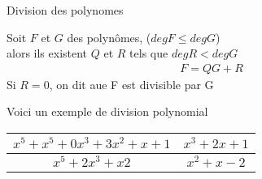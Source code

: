 \begin{definition}{Division des polynomes}
	\begin{theorem}
		Soit $F$ et $G$ des polynômes, ($degF\leq degG$)\\ 
		alors ils existent $Q$ et $R$ tels que $degR<degG$
		\begin{align*}
			F=QG+R
  		\end{align*}
		Si $R=0$, on dit aue F est divisible par G 
		\begin{example}
			Voici un exemple de division polynomial
			\begin{table}
			\begin{tabular}{|c|c|}
				\hline
   				$x^5+x^5+0x^3+3x^2+x+1$ & $x^3+2x+1$ \\ 	
				\hline 
				$x^5+2x^3+x2$ & $x^2+x-2$ \\
				\hline
   			\end{tabular}
			\end{table}
		\end{example}
	\end{theorem}
\end{definition}
